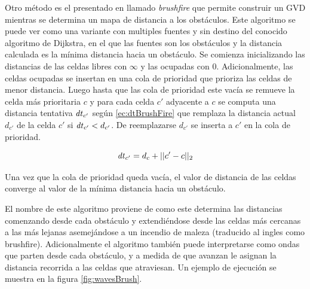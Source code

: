 Otro método es el presentado en \cite{choset2005principles} llamado
\emph{brushfire} que permite construir un GVD mientras se determina un mapa de
distancia a los obstáculos.
Este algoritmo se puede ver como una variante con multiples fuentes y sin
destino del conocido algoritmo de Dijkstra, en el que las fuentes son los
obstáculos y la distancia calculada es la mínima distancia hacia un obstáculo.
Se comienza inicializando las distancias de las celdas libres con $\infty$ y
las ocupadas con $0$.  Adicionalmente, las celdas ocupadas se insertan en una
cola de prioridad que prioriza las celdas de menor distancia. Luego hasta que
las cola de prioridad este vacía se remueve la celda más prioritaria $c$ y para
cada celda $c'$ adyacente a $c$ se computa una distancia tentativa $\mathit{dt}_{c'}$
según \eqref{ec:dtBrushFire} que remplaza la distancia actual $d_{c'}$ de la
celda $c'$ si $\mathit{dt}_{c'}<d_{c'}$. De reemplazarse $d_{c'}$ se inserta a $c'$ en
la cola de prioridad. 

\begin{equation}\label{ec:dtBrushFire}
  \mathit{dt}_{c'} = d_c+||c'-c||_2
\end{equation}

Una vez que la cola de prioridad queda vacía, el valor de distancia de las celdas converge al valor de la mínima distancia hacia un obstáculo. 

El nombre de este algoritmo proviene de como este determina las distancias comenzando desde cada obstáculo y extendiéndose desde las celdas más cercanas a las más lejanas asemejándose a un incendio de maleza (traducido al ingles como brushfire). Adicionalmente el algoritmo también puede interpretarse como ondas que parten desde cada obstáculo, y a medida de que avanzan le asignan la distancia recorrida a las celdas que atraviesan. Un ejemplo de ejecución se muestra en la figura \ref{fig:wavesBrush}.  


